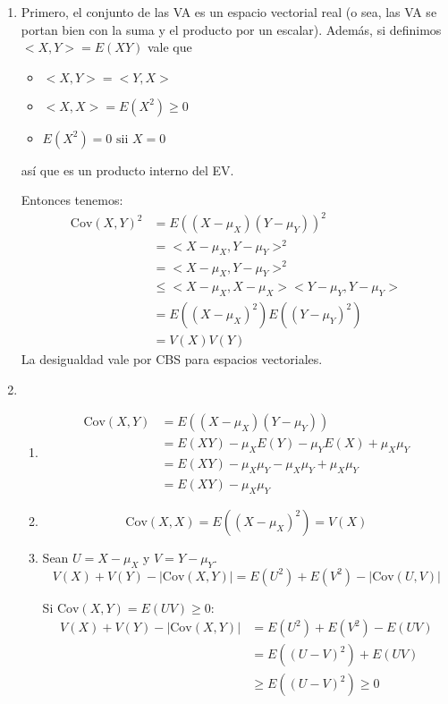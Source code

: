 \begin{enumerate}
	\item
		Primero, el conjunto de las VA es un espacio vectorial real (o sea, las VA se portan bien con la suma y el producto por un escalar).
		Además, si definimos $<X,Y> = E(XY)$ vale que
		\begin{itemize}
			\item $<X,Y> = <Y,X>$
			\item $<X,X> = E(X^2) \geq 0$
			\item $E(X^2) = 0 \text{ sii } X=0$
		\end{itemize}
		así que es un producto interno del EV.
		
		Entonces tenemos:
		\begin{align*}
			\text{Cov}(X,Y)^2	& = E((X - \mu_X)(Y - \mu_Y))^2	\\
								& = <X-\mu_X, Y-\mu_Y>^2		\\
								& = <X-\mu_X, Y-\mu_Y>^2		\\
								& \leq <X-\mu_X, X-\mu_X><Y-\mu_Y,Y-\mu_Y>		\\
								& = E((X-\mu_X)^2)E((Y-\mu_Y)^2)				\\
								& = V(X)V(Y)
		\end{align*}
		La desigualdad vale por CBS para espacios vectoriales.
	
	\item
		\begin{enumerate}
			\item
				\begin{align*}
					\text{Cov}(X,Y)	& = E((X-\mu_X)(Y-\mu_Y))							\\
									& = E(XY) - \mu_XE(Y) - \mu_YE(X) + \mu_X\mu_Y		\\
									& = E(XY) - \mu_X\mu_Y - \mu_X\mu_Y + \mu_X\mu_Y	\\
									& = E(XY) - \mu_X\mu_Y
				\end{align*}
			\item $$\text{Cov}(X,X) = E((X-\mu_X)^2) = V(X)$$
			\item
				Sean $U=X-\mu_X$ y $V=Y-\mu_Y$.
				$$V(X) + V(Y) - |\text{Cov}(X,Y)| = E(U^2) + E(V^2) - |\text{Cov}(U,V)|$$
				
				Si $\text{Cov}(X,Y) = E(UV) \geq 0$:
				\begin{align*}
					V(X) + V(Y) - |\text{Cov}(X,Y)|	& = E(U^2) + E(V^2) - E(UV)	\\
													& = E((U-V)^2) + E(UV)		\\
													& \geq E((U-V)^2) \geq 0
				\end{align*}
				

\end{enumerate}
\end{enumerate}
